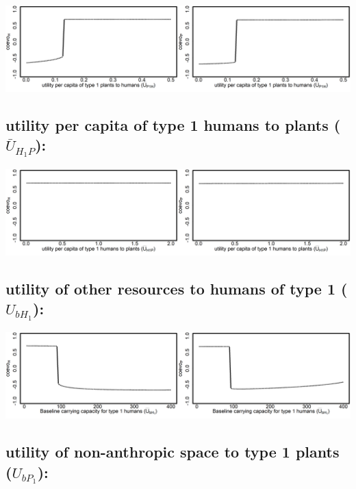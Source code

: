 \documentclass[
]{book}
\begin{document}
\includegraphics[width=1\linewidth]{plots/2_onePar-mU.P1H_bifplot-pair}

\hypertarget{utility-per-capita-of-type-1-humans-to-plants-baru_h_1p}{%
\subsection{\texorpdfstring{utility per capita \textbf{of} type 1 humans \textbf{to} plants (\(\bar{U}_{H_{1}P}\)):}{utility per capita of type 1 humans to plants (\textbackslash bar\{U\}\_\{H\_\{1\}P\}):}}\label{utility-per-capita-of-type-1-humans-to-plants-baru_h_1p}}

\includegraphics[width=1\linewidth]{plots/2_onePar-mU.H1P_bifplot-pair}

\hypertarget{utility-of-other-resources-to-humans-of-type-1-u_bh_1}{%
\subsection{\texorpdfstring{utility \textbf{of} other resources \textbf{to} humans of type 1 (\(U_{bH_{1}}\)):}{utility of other resources to humans of type 1 (U\_\{bH\_\{1\}\}):}}\label{utility-of-other-resources-to-humans-of-type-1-u_bh_1}}

\includegraphics[width=1\linewidth]{plots/2_onePar-U.bH1_bifplot-pair}

\hypertarget{utility-of-non-anthropic-space-to-type-1-plants-u_bp_1}{%
\subsection{\texorpdfstring{utility \textbf{of} non-anthropic space \textbf{to} type 1 plants (\(U_{bP_{1}}\)):}{utility of non-anthropic space to type 1 plants (U\_\{bP\_\{1\}\}):}}\label{utility-of-non-anthropic-space-to-type-1-plants-u_bp_1}}
\end{document}
